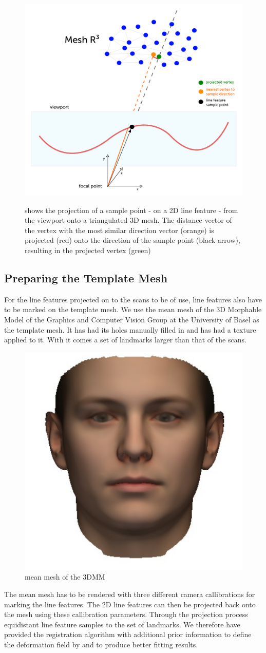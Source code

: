 \begin{figure}[h!]
    \includegraphics[width=\textwidth]{./resources/figures/projection.pdf}
\label{fig:projection}
\caption{shows the projection of a sample point - on a 2D line feature - from the viewport onto a triangulated 3D mesh. The distance vector of the vertex with the most similar direction vector (orange) is projected (red) onto the direction of the sample point (black arrow), resulting in the projected vertex (green)}
\end{figure}
\subsection{Preparing the Template Mesh}
For the line features projected on to the scans to be of use, line features also have to be marked on the template mesh. We use the mean mesh of the 3D Morphable Model of the Graphics and Computer Vision Group at the University of Basel as the template mesh. It has had its holes manually filled in and has had a texture applied to it. With it comes a set of landmarks larger than that of the scans. 
\begin{figure}
    \includegraphics[width=.2\textwidth]{./resources/img/mean_msh.pdf}
    \caption{mean mesh of the 3DMM}
\end{figure}
The mean mesh has to be rendered with three different camera callibrations for marking the line features. The 2D line features can then be projected back onto the mesh using these callibration parameters. Through the projection process equidistant line feature samples to the set of landmarks. We therefore have provided the registration algorithm with additional prior information to define the deformation field by and to produce better fitting results.

